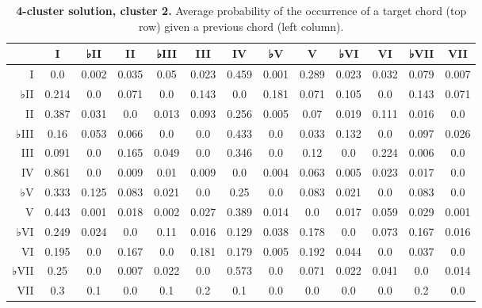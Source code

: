 \begin{table}[htbp]
\begin{minipage}{\linewidth}
\setlength{\tymax}{0.5\linewidth}
\centering
\small
\caption{\textbf{4-cluster solution, cluster 2.} Average probability of the occurrence of a target chord (top row) given a previous chord (left column).}
\label{4-clustersolutioncluster2.averageprobabilityoftheoccurrenceofatargetchordtoprowgivenapreviouschordleftcolumn.}
\begin{tabulary}{\textwidth}{@{}RCCCCCCCCCCCC@{}} \toprule
&I&♭II&II&♭III&III&IV&♭V&V&♭VI&VI&♭VII&VII\\
\midrule
I&0.0&0.002&0.035&0.05&0.023&0.459&0.001&0.289&0.023&0.032&0.079&0.007\\
♭II&0.214&0.0&0.071&0.0&0.143&0.0&0.181&0.071&0.105&0.0&0.143&0.071\\
II&0.387&0.031&0.0&0.013&0.093&0.256&0.005&0.07&0.019&0.111&0.016&0.0\\
♭III&0.16&0.053&0.066&0.0&0.0&0.433&0.0&0.033&0.132&0.0&0.097&0.026\\
III&0.091&0.0&0.165&0.049&0.0&0.346&0.0&0.12&0.0&0.224&0.006&0.0\\
IV&0.861&0.0&0.009&0.01&0.009&0.0&0.004&0.063&0.005&0.023&0.017&0.0\\
♭V&0.333&0.125&0.083&0.021&0.0&0.25&0.0&0.083&0.021&0.0&0.083&0.0\\
V&0.443&0.001&0.018&0.002&0.027&0.389&0.014&0.0&0.017&0.059&0.029&0.001\\
♭VI&0.249&0.024&0.0&0.11&0.016&0.129&0.038&0.178&0.0&0.073&0.167&0.016\\
VI&0.195&0.0&0.167&0.0&0.181&0.179&0.005&0.192&0.044&0.0&0.037&0.0\\
♭VII&0.25&0.0&0.007&0.022&0.0&0.573&0.0&0.071&0.022&0.041&0.0&0.014\\
VII&0.3&0.1&0.0&0.1&0.2&0.1&0.0&0.0&0.0&0.0&0.2&0.0\\

\bottomrule

\end{tabulary}
\end{minipage}
\end{table}

